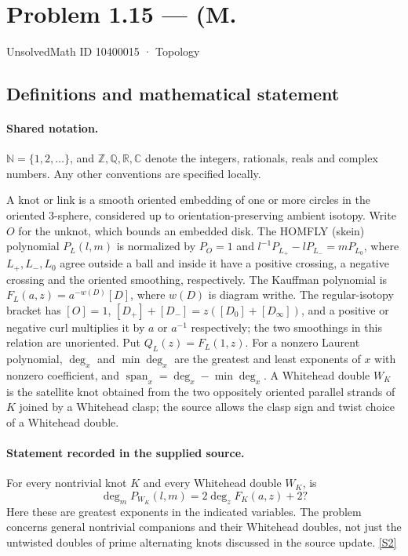 \documentclass[11pt]{article}
\newcommand{\sref}[2]{\hyperlink{source:#1:#2}{[S#2]}}
\begin{document}
\setcounter{section}{10400014}
\section{Problem 1.15 — (M.}\label{10400015}
{\small\sffamily UnsolvedMath ID 10400015 · Topology}
\subsection{Definitions and mathematical statement}

\paragraph{Shared notation.}$\mathbb N=\{1,2,\ldots\}$, and $\mathbb Z,\mathbb Q,\mathbb R,\mathbb C$ denote the integers, rationals, reals and complex numbers. Any other conventions are specified locally.


A knot or link is a smooth oriented embedding of one or more circles in the oriented $3$-sphere, considered up to orientation-preserving ambient isotopy. Write $O$ for the unknot, which bounds an embedded disk. The HOMFLY (skein) polynomial $P_L(l,m)$ is normalized by $P_O=1$ and $l^{-1}P_{L_+}-lP_{L_-}=mP_{L_0}$, where $L_+,L_-,L_0$ agree outside a ball and inside it have a positive crossing, a negative crossing and the oriented smoothing, respectively. The Kauffman polynomial is $F_L(a,z)=a^{-w(D)}[D]$, where $w(D)$ is diagram writhe. The regular-isotopy bracket has $[O]=1$, $[D_+]+[D_-]=z([D_0]+[D_\infty])$, and a positive or negative curl multiplies it by $a$ or $a^{-1}$ respectively; the two smoothings in this relation are unoriented. Put $Q_L(z)=F_L(1,z)$. For a nonzero Laurent polynomial, $\deg_x$ and $\min\deg_x$ are the greatest and least exponents of $x$ with nonzero coefficient, and $\operatorname{span}_x=\deg_x-\min\deg_x$. A Whitehead double $W_K$ is the satellite knot obtained from the two oppositely oriented parallel strands of $K$ joined by a Whitehead clasp; the source allows the clasp sign and twist choice of a Whitehead double.
\paragraph{Statement recorded in the supplied source.}
For every nontrivial knot $K$ and every Whitehead double $W_K$, is
\[\deg_mP_{W_K}(l,m)=2\deg_zF_K(a,z)+2?\]
Here these are greatest exponents in the indicated variables. The problem concerns general nontrivial companions and their Whitehead doubles, not just the untwisted doubles of prime alternating knots discussed in the source update. \sref{10400015}{2}
\end{document}

